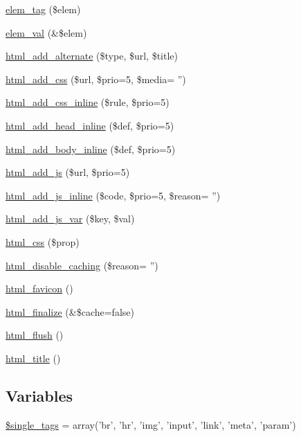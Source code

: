 \begin{DoxyCompactItemize}
\hyperlink{html_8inc_8php_a158c5e6dccf734bc8c035e6bcd0a446f}{elem\_\-tag} (\$elem)
\item 
\hyperlink{html_8inc_8php_ae28d850c3c906c6884462ca89c06f59b}{elem\_\-val} (\&\$elem)
\item 
\hyperlink{html_8inc_8php_ae013e8f0bdd681184ee1873a1964c454}{html\_\-add\_\-alternate} (\$type, \$url, \$title)
\item 
\hyperlink{html_8inc_8php_a962ef1b29e909a38b9a7b79086d54ab2}{html\_\-add\_\-css} (\$url, \$prio=5, \$media= '')
\item 
\hyperlink{html_8inc_8php_aae42f14c51b89215ad79b303ecb6e9e9}{html\_\-add\_\-css\_\-inline} (\$rule, \$prio=5)
\item 
\hyperlink{html_8inc_8php_a3c3f439a358951694d2280124bd6e2b9}{html\_\-add\_\-head\_\-inline} (\$def, \$prio=5)
\item 
\hyperlink{html_8inc_8php_a2f59375f9b3aac2cf9ab8968cca33e17}{html\_\-add\_\-body\_\-inline} (\$def, \$prio=5)
\item 
\hyperlink{html_8inc_8php_a450214704e1bbc2e8849abb54db38a03}{html\_\-add\_\-js} (\$url, \$prio=5)
\item 
\hyperlink{html_8inc_8php_a9b9c28bfb08c81ccc10a3064b6775dc0}{html\_\-add\_\-js\_\-inline} (\$code, \$prio=5, \$reason= '')
\item 
\hyperlink{html_8inc_8php_a84769b7fe7b5454ff46534d0577eb54c}{html\_\-add\_\-js\_\-var} (\$key, \$val)
\item 
\hyperlink{html_8inc_8php_ad52276fa2a03df7342ba4b8e6a334ce0}{html\_\-css} (\$prop)
\item 
\hyperlink{html_8inc_8php_ab0dafe79ee61164014b0a4d8b4112dbb}{html\_\-disable\_\-caching} (\$reason= '')
\item 
\hyperlink{html_8inc_8php_a5738adf9b56d1ff2b8d02977ed7929ce}{html\_\-favicon} ()
\item 
\hyperlink{html_8inc_8php_a405dc7e3718d4196c05087057ebf69bf}{html\_\-finalize} (\&\$cache=false)
\item 
\hyperlink{html_8inc_8php_af8cd696bd10c945b09dae962d549b75b}{html\_\-flush} ()
\item 
\hyperlink{html_8inc_8php_a3f572f51a815fe19c590fea7d6d3a1a6}{html\_\-title} ()
\end{DoxyCompactItemize}
\subsection*{Variables}
\begin{DoxyCompactItemize}
\item 
\hyperlink{html_8inc_8php_a0a733c7a281726a879f13e7325881887}{\$single\_\-tags} = array('br', 'hr', 'img', 'input', 'link', 'meta', 'param')
\end{DoxyCompactItemize}


